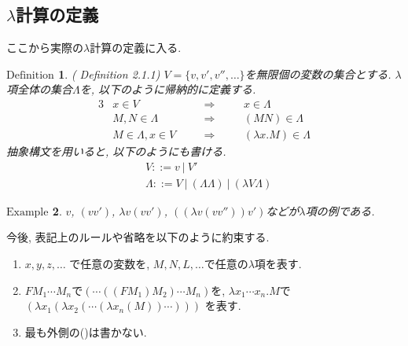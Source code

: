 \documentclass[11pt]{jsreport}
\theoremstyle{mystyle}
\newtheorem{df}{$\textrm{Definition}$}[section]
\newtheorem{ex}[df]{$\textrm{Example}$}
\newtheorem{rmk}[df]{$\textrm{Remark}$}
\newcommand{\Lra}{\Longrightarrow}
\newcommand{\0}{\textbf{0}}
\begin{document}
\subsection*{$\lambda$計算の定義}
ここから実際の$\lambda$計算の定義に入る. 
\begin{shadebox}
  \begin{df}{(\cite{Bar} Definition 2.1.1)}
    $V = \{ v, v', v'', \ldots \}$を無限個の変数の集合とする. 
    $\lambda$項全体の集合$\Lambda$を, 以下のように帰納的に定義する. 
    \begin{alignat*}{3}
      &x \in V& \quad &\Lra& \quad &x \in \Lambda \\
      &M, N \in \Lambda& &\Lra& &(MN) \in \Lambda \\
      &M \in \Lambda, x \in V& &\Lra& &(\lambda x . M) \in \Lambda
    \end{alignat*}
    抽象構文を用いると, 以下のようにも書ける. 
    \begin{align*}
      &V ::= v\ |\ V' \\
      &\Lambda ::= V\ |\ (\Lambda \Lambda)\ |\ (\lambda V \Lambda)
    \end{align*}
  \end{df}
\end{shadebox}
\begin{ex}
  $v$, $(v v')$, $\lambda v (v v')$, $((\lambda v (vv''))v')$などが$\lambda$項の例である. 
\end{ex}
今後, 表記上のルールや省略を以下のように約束する. 
\begin{enumerate}
  \item $x, y, z, \ldots$ で任意の変数を, $M, N, L, \ldots$で任意の$\lambda$項を表す. 
  \item $F M_1 \cdots M_n$で$(\cdots ((F M_1) M_2)\cdots M_n)$を, 
           $\lambda x_1 \cdots x_n .M$で
           $(\lambda x_1 (\lambda x_2 (\cdots (\lambda x_n(M))\cdots)))$
            を表す. 
  \item 最も外側の()は書かない. 
\end{enumerate}
\end{document}
